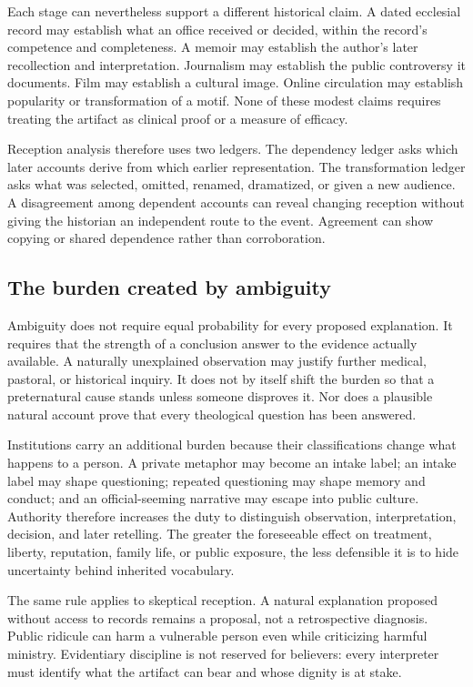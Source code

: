 Each stage can nevertheless support a different historical claim. A dated
ecclesial record may establish what an office received or decided, within the
record's competence and completeness. A memoir may establish the author's
later recollection and interpretation. Journalism may establish the public
controversy it documents. Film may establish a cultural image. Online
circulation may establish popularity or transformation of a motif. None of
these modest claims requires treating the artifact as clinical proof or a
measure of efficacy.

Reception analysis therefore uses two ledgers. The dependency ledger asks
which later accounts derive from which earlier representation. The
transformation ledger asks what was selected, omitted, renamed, dramatized, or
given a new audience. A disagreement among dependent accounts can reveal
changing reception without giving the historian an independent route to the
event. Agreement can show copying or shared dependence rather than
corroboration.

\subsection{The burden created by ambiguity}

Ambiguity does not require equal probability for every proposed explanation.
It requires that the strength of a conclusion answer to the evidence actually
available. A naturally unexplained observation may justify further medical,
pastoral, or historical inquiry. It does not by itself shift the burden so that
a preternatural cause stands unless someone disproves it. Nor does a plausible
natural account prove that every theological question has been answered.

Institutions carry an additional burden because their classifications change
what happens to a person. A private metaphor may become an intake label; an
intake label may shape questioning; repeated questioning may shape memory and
conduct; and an official-seeming narrative may escape into public culture.
Authority therefore increases the duty to distinguish observation,
interpretation, decision, and later retelling. The greater the foreseeable
effect on treatment, liberty, reputation, family life, or public exposure, the
less defensible it is to hide uncertainty behind inherited vocabulary.

The same rule applies to skeptical reception. A natural explanation proposed
without access to records remains a proposal, not a retrospective diagnosis.
Public ridicule can harm a vulnerable person even while criticizing harmful
ministry. Evidentiary discipline is not reserved for believers: every
interpreter must identify what the artifact can bear and whose dignity is at
stake.

